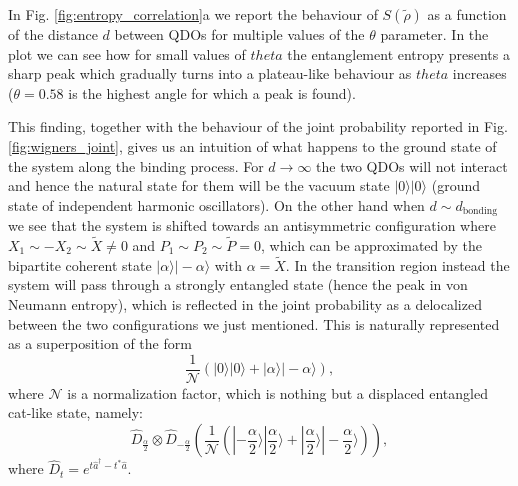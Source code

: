 \documentclass[reprint, amsmath, amssymb, floatfix, aps, pra]{revtex4-2}
\newcommand{\ket}[1]{|#1\rangle}
\begin{document}
In Fig. \ref{fig:entropy_correlation}a we report the behaviour of $S(\tilde{\rho})$ as a function of the distance $d$ between QDOs for multiple values of the $\theta$ parameter. In the plot we can see how for small values of $theta$ the entanglement entropy presents a sharp peak which gradually turns into a plateau-like behaviour as $theta$ increases ($\theta = 0.58$ is the highest angle for which a peak is found). 

This finding, together with the behaviour of the joint probability reported in Fig. \ref{fig:wigners_joint}, gives us an intuition of what happens to the ground state of the system along the binding process. For $d\rightarrow \infty$ the two QDOs will not interact and hence the natural state for them will be the vacuum state $\ket{0}\ket{0}$ (ground state of independent harmonic oscillators). On the other hand when $d \sim d_{\mathrm{bonding}}$ we see that the system is shifted towards an antisymmetric configuration where $X_1 \sim -X_2 \sim \tilde{X} \neq 0$ and $P_1 \sim P_2 \sim \tilde{P} = 0$, which can be approximated by the bipartite coherent state $\ket{\alpha}\ket{-\alpha}$ with $\alpha = \tilde{X}$. In the transition region instead the system will pass through a strongly entangled state (hence the peak in von Neumann entropy), which is reflected in the joint probability as a delocalized between the two configurations we just mentioned. This is naturally represented as a superposition of the form 
\begin{equation}
    \frac{1}{\mathcal{N}}\left(\ket{0}\ket{0} + \ket{\alpha}\ket{-\alpha}\right),
\end{equation} 
where $\mathcal{N}$ is a normalization factor, which is nothing but a displaced entangled cat-like state, namely:
\begin{equation}
    \hat{D}_{\frac{\alpha}{2}}\otimes\hat{D}_{-\frac{\alpha}{2}}\left(\frac{1}{\mathcal{N}}\left(\ket{-\frac{\alpha}{2}}\ket{\frac{\alpha}{2}} + \ket{\frac{\alpha}{2}}\ket{-\frac{\alpha}{2}}\right)\right),
\end{equation} 
where $\hat{D}_{t} = e^{t\hat{a}^{\dagger} - t^{*}\hat{a}}$.
\end{document}

